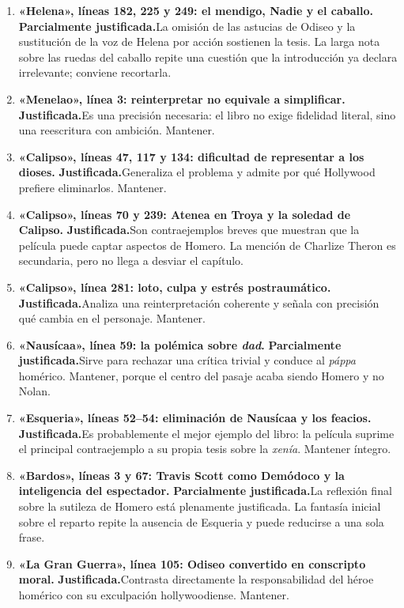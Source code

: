 \documentclass[11pt,a4paper]{article}
\newcommand{\justificada}{\textbf{Justificada.}}
\newcommand{\parcial}{\textbf{Parcialmente justificada.}}
\begin{document}
\begin{enumerate}
\item \textbf{«Helena», líneas 182, 225 y 249: el mendigo, Nadie y el caballo.} \parcial La omisión de las astucias de Odiseo y la sustitución de la voz de Helena por acción sostienen la tesis. La larga nota sobre las ruedas del caballo repite una cuestión que la introducción ya declara irrelevante; conviene recortarla.

\item \textbf{«Menelao», línea 3: reinterpretar no equivale a simplificar.} \justificada Es una precisión necesaria: el libro no exige fidelidad literal, sino una reescritura con ambición. Mantener.

\item \textbf{«Calipso», líneas 47, 117 y 134: dificultad de representar a los dioses.} \justificada Generaliza el problema y admite por qué Hollywood prefiere eliminarlos. Mantener.

\item \textbf{«Calipso», líneas 70 y 239: Atenea en Troya y la soledad de Calipso.} \justificada Son contraejemplos breves que muestran que la película puede captar aspectos de Homero. La mención de Charlize Theron es secundaria, pero no llega a desviar el capítulo.

\item \textbf{«Calipso», línea 281: loto, culpa y estrés postraumático.} \justificada Analiza una reinterpretación coherente y señala con precisión qué cambia en el personaje. Mantener.

\item \textbf{«Nausícaa», línea 59: la polémica sobre \emph{dad}.} \parcial Sirve para rechazar una crítica trivial y conduce al \emph{páppa} homérico. Mantener, porque el centro del pasaje acaba siendo Homero y no Nolan.

\item \textbf{«Esqueria», líneas 52--54: eliminación de Nausícaa y los feacios.} \justificada Es probablemente el mejor ejemplo del libro: la película suprime el principal contraejemplo a su propia tesis sobre la \emph{xenía}. Mantener íntegro.

\item \textbf{«Bardos», líneas 3 y 67: Travis Scott como Demódoco y la inteligencia del espectador.} \parcial La reflexión final sobre la sutileza de Homero está plenamente justificada. La fantasía inicial sobre el reparto repite la ausencia de Esqueria y puede reducirse a una sola frase.

\item \textbf{«La Gran Guerra», línea 105: Odiseo convertido en conscripto moral.} \justificada Contrasta directamente la responsabilidad del héroe homérico con su exculpación hollywoodiense. Mantener.


\end{enumerate}
\end{document}
